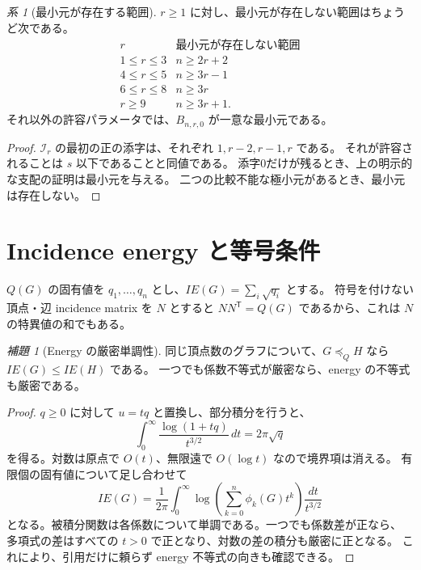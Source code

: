 \documentclass[12pt]{amsart}
\theoremstyle{definition}
\theoremstyle{remark}
\numberwithin{equation}{section}
\newtheorem{jlem}[thm]{補題}
\newtheorem{jcor}[thm]{系}
\begin{document}
\begin{jcor}[最小元が存在する範囲]\label{ja:least}
$r\ge1$ に対し、最小元が存在しない範囲はちょうど次である。
\[
 \begin{array}{c|c}
 r&\text{最小元が存在しない範囲}\\\hline
 1\le r\le3&n\ge2r+2\\
 4\le r\le5&n\ge3r-1\\
 6\le r\le8&n\ge3r\\
 r\ge9&n\ge3r+1.
 \end{array}
\]
それ以外の許容パラメータでは、$B_{n,r,0}$ が一意な最小元である。
\end{jcor}
\begin{proof}
$\mathcal I_r$ の最初の正の添字は、それぞれ $1,r-2,r-1,r$ である。
それが許容されることは $s$ 以下であることと同値である。
添字0だけが残るとき、上の明示的な支配の証明は最小元を与える。
二つの比較不能な極小元があるとき、最小元は存在しない。
\end{proof}

\section{Incidence energy と等号条件}
$Q(G)$ の固有値を $q_1,\ldots,q_n$ とし、$IE(G)=\sum_i\sqrt{q_i}$ とする。
符号を付けない頂点・辺 incidence matrix を $N$ とすると
$NN^{\mathsf T}=Q(G)$ であるから、これは $N$ の特異値の和でもある。

\begin{jlem}[Energy の厳密単調性]\label{ja:energy}
同じ頂点数のグラフについて、$G\preceq_Q H$ なら $IE(G)\le IE(H)$ である。
一つでも係数不等式が厳密なら、energy の不等式も厳密である。
\end{jlem}
\begin{proof}
$q\ge0$ に対して $u=tq$ と置換し、部分積分を行うと、
\[
 \int_0^\infty\frac{\log(1+tq)}{t^{3/2}}\,dt=2\pi\sqrt q
\]
を得る。対数は原点で $O(t)$、無限遠で $O(\log t)$ なので境界項は消える。
有限個の固有値について足し合わせて
\begin{equation}\label{ja:IEint}
 IE(G)=\frac1{2\pi}\int_0^\infty
 \log\left(\sum_{k=0}^n\phi_k(G)t^k\right)\frac{dt}{t^{3/2}}
\end{equation}
となる。被積分関数は各係数について単調である。一つでも係数差が正なら、
多項式の差はすべての $t>0$ で正となり、対数の差の積分も厳密に正となる。
これにより、引用だけに頼らず energy 不等式の向きも確認できる。
\end{proof}
\end{document}
